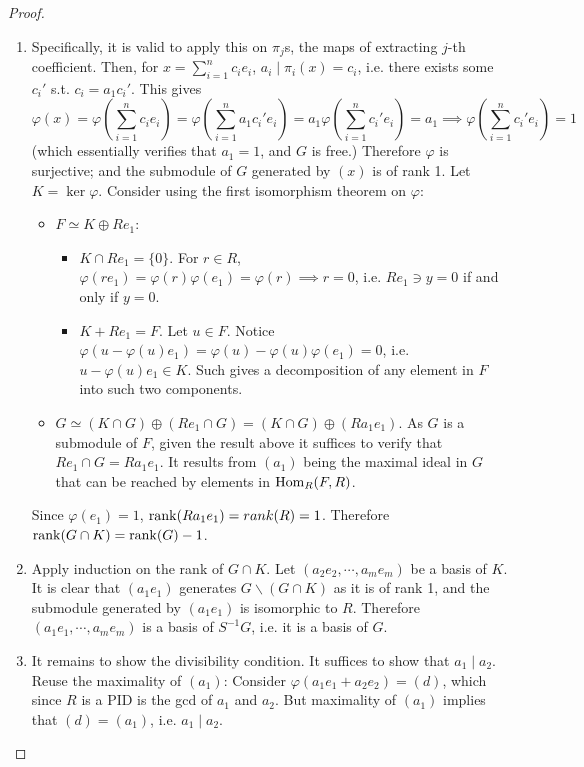 \begin{proof}
\begin{itemize}
\begin{enumerate}[label=\arabic*)]
            \item Specifically, it is valid to apply this on $\pi_j$s, the maps of extracting $j$-th coefficient. Then, for $x = \sum_{i=1}^n c_i e_i$, $a_i \mid \pi_i(x) = c_i$, i.e. there exists some $c_i'$ s.t. $c_i = a_1 c_i'$. This gives
            \[
                \varphi(x) = \varphi\left(\sum_{i=1}^n c_i e_i\right) = \varphi\left(\sum_{i=1}^n a_1 c_i' e_i\right) = a_1 \varphi\left( \sum_{i=1}^n c_i' e_i \right) = a_1 \implies \varphi \left( \sum_{i=1}^n c_i' e_i \right) = 1
            \]
            (which essentially verifies that $a_1 = 1$, and $G$ is free.) Therefore $\varphi$ is surjective; and the submodule of $G$ generated by $(x)$ is of rank 1. Let $K = \ker \varphi$. Consider using the first isomorphism theorem on $\varphi$:
            \begin{itemize}
                \item $F \simeq K \oplus Re_1$:
                \begin{itemize}
                    \item $K \cap Re_1 = \{0\}$. For $r\in R$, $\varphi(r e_1) = \varphi(r) \varphi(e_1) = \varphi(r) \implies r = 0$, i.e. $Re_1 \ni y = 0$ if and only if $y = 0$.
                    \item $K + Re_1 = F$. Let $u\in F$. Notice $\varphi(u - \varphi(u)e_1) = \varphi(u) - \varphi(u) \varphi(e_1) = 0$, i.e. $u - \varphi(u)e_1 \in K$. Such gives a decomposition of any element in $F$ into such two components.
                \end{itemize}
                \item $G \simeq (K \cap G) \oplus (Re_1 \cap G) = (K \cap G) \oplus (R a_1 e_1)$. As $G$ is a submodule of $F$, given the result above it suffices to verify that $Re_1 \cap G = Ra_1 e_1$. It results from $(a_1)$ being the maximal ideal in $G$ that can be reached by elements in $\mathrm{Hom}_R(F, R)$.
            \end{itemize}
            Since $\varphi(e_1) = 1$, $\mathrm{rank}(Ra_1 e_1) = rank(R) = 1$. Therefore $\mathrm{rank}(G \cap K) = \mathrm{rank}(G) - 1$.
            \item Apply induction on the rank of $G \cap K$. Let $(a_2 e_2, \cdots, a_m e_m)$ be a basis of $K$. It is clear that $(a_1 e_1)$ generates $G \smallsetminus (G \cap K)$ as it is of rank 1, and the submodule generated by $(a_1 e_1)$ is isomorphic to $R$. Therefore $(a_1e_1, \cdots, a_m e_m)$ is a basis of $S^{-1}G$, i.e. it is a basis of $G$. 
            \item It remains to show the divisibility condition. It suffices to show that $a_1 \mid a_2$. Reuse the maximality of $(a_1)$: Consider $\varphi(a_1 e_1 + a_2 e_2) = (d)$, which since $R$ is a PID is the gcd of $a_1$ and $a_2$. But maximality of $(a_1)$ implies that $(d) = (a_1)$, i.e. $a_1 \mid a_2$.  
        \end{enumerate}
    \end{itemize}
\end{proof}

